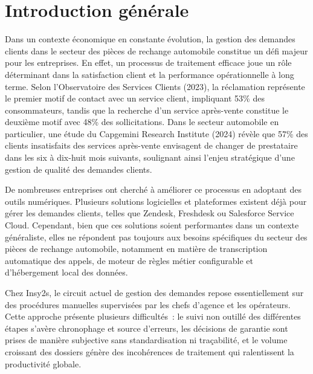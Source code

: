 \chapter*{Introduction g\'{e}n\'{e}rale}

\indent Dans un contexte \'{e}conomique en constante \'{e}volution, la gestion des demandes clients dans le secteur des pi\`{e}ces de rechange automobile constitue un d\'{e}fi majeur pour les entreprises. En effet, un processus de traitement efficace joue un r\^{o}le d\'{e}terminant dans la satisfaction client et la performance op\'{e}rationnelle \`{a} long terme. Selon l'Observatoire des Services Clients (2023), la r\'{e}clamation repr\'{e}sente le premier motif de contact avec un service client, impliquant 53\% des consommateurs, tandis que la recherche d'un service apr\`{e}s-vente constitue le deuxi\`{e}me motif avec 48\% des sollicitations. Dans le secteur automobile en particulier, une \'{e}tude du Capgemini Research Institute (2024) r\'{e}v\`{e}le que 57\% des clients insatisfaits des services apr\`{e}s-vente envisagent de changer de prestataire dans les six \`{a} dix-huit mois suivants, soulignant ainsi l'enjeu strat\'{e}gique d'une gestion de qualit\'{e} des demandes clients.

\indent De nombreuses entreprises ont cherch\'{e} \`{a} am\'{e}liorer ce processus en adoptant des outils num\'{e}riques. Plusieurs solutions logicielles et plateformes existent d\'{e}j\`{a} pour g\'{e}rer les demandes clients, telles que Zendesk, Freshdesk ou Salesforce Service Cloud. Cependant, bien que ces solutions soient performantes dans un contexte g\'{e}n\'{e}raliste, elles ne r\'{e}pondent pas toujours aux besoins sp\'{e}cifiques du secteur des pi\`{e}ces de rechange automobile, notamment en mati\`{e}re de transcription automatique des appels, de moteur de r\`{e}gles m\'{e}tier configurable et d'h\'{e}bergement local des donn\'{e}es.

\indent Chez Insy2s, le circuit actuel de gestion des demandes repose essentiellement sur des proc\'{e}dures manuelles supervis\'{e}es par les chefs d'agence et les op\'{e}rateurs. Cette approche pr\'{e}sente plusieurs difficult\'{e}s~: le suivi non outill\'{e} des diff\'{e}rentes \'{e}tapes s'av\`{e}re chronophage et source d'erreurs, les d\'{e}cisions de garantie sont prises de mani\`{e}re subjective sans standardisation ni tra\c{c}abilit\'{e}, et le volume croissant des dossiers g\'{e}n\`{e}re des incoh\'{e}rences de traitement qui ralentissent la productivit\'{e} globale.

